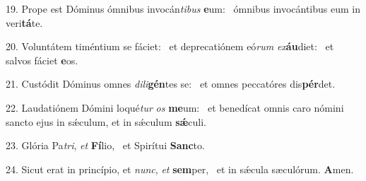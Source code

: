 19. Prope est Dóminus ómnibus invocán\textit{ti}\textit{bus} \textbf{e}um: \ast\  ómnibus invocántibus eum in veri\textbf{tá}te.\

20. Voluntátem timéntium se fáciet: \dag\  et deprecatiónem eó\textit{rum} \textit{ex}\textbf{áu}diet: \ast\  et salvos fáciet \textbf{e}os.\

21. Custódit Dóminus omnes \textit{di}\textit{li}\textbf{gén}tes se: \ast\  et omnes peccatóres dis\textbf{pér}det.\

22. Laudatiónem Dómini loqué\textit{tur} \textit{os} \textbf{me}um: \ast\  et benedícat omnis caro nómini sancto ejus in sǽculum, et in sǽculum \textbf{sǽ}culi.\

23. Glória Pa\textit{tri}, \textit{et} \textbf{Fí}lio, \ast\  et Spirítui \textbf{Sanc}to.\

24. Sicut erat in princípio, et \textit{nunc}, \textit{et} \textbf{sem}per, \ast\  et in sǽcula sæculórum. \textbf{A}men.\

